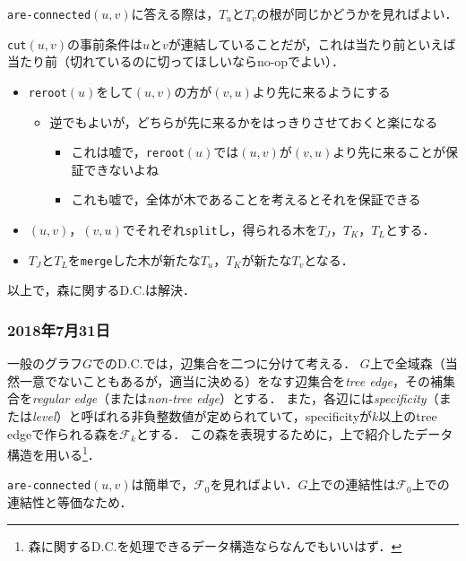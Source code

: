 \documentclass[a4paper]{jsarticle}
\begin{document}
\texttt{are-connected}$(u, v)$に答える際は，$T_u$と$T_v$の根が同じかどうかを見ればよい．

\texttt{cut}$(u, v)$の事前条件は$u$と$v$が連結していることだが，これは当たり前といえば当たり前（切れているのに切ってほしいならno-opでよい）．
\begin{itemize}
\item \texttt{reroot}$(u)$をして$(u, v)$の方が$(v, u)$より先に来るようにする
  \begin{itemize}
  \item 逆でもよいが，どちらが先に来るかをはっきりさせておくと楽になる
    \begin{itemize}
    \item これは嘘で，\texttt{reroot}$(u)$では$(u, v)$が$(v, u)$より先に来ることが保証できないよね
    \item これも嘘で，全体が木であることを考えるとそれを保証できる
    \end{itemize}
  \end{itemize}
\item $(u, v)$，$(v, u)$でそれぞれ\texttt{split}し，得られる木を$T_J$，$T_K$，$T_L$とする．
\item $T_J$と$T_L$を\texttt{merge}した木が新たな$T_u$，$T_K$が新たな$T_v$となる．
\end{itemize}

以上で，森に関するD.C.は解決．

\subsubsection{2018年7月31日}
一般のグラフ$G$でのD.C.では，辺集合を二つに分けて考える．
$G$上で全域森（当然一意でないこともあるが，適当に決める）をなす辺集合を\textit{tree edge}，その補集合を\textit{regular edge}（または\textit{non-tree edge}）とする．
また，各辺には\textit{specificity}（または\textit{level}）と呼ばれる非負整数値が定められていて，specificityが$k$以上のtree edgeで作られる森を$\mathscr{F}_k$とする．
この森を表現するために，上で紹介したデータ構造を用いる\footnote{森に関するD.C.を処理できるデータ構造ならなんでもいいはず．}．

\texttt{are-connected}$(u, v)$は簡単で，$\mathscr{F}_0$を見ればよい．$G$上での連結性は$\mathscr{F}_0$上での連結性と等価なため．
\end{document}
